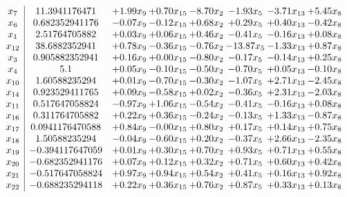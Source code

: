 \documentclass[8pt]{article}
\begin{document}
\[\begin{array}{c| c c@{\hskip 2pt} c@{\hskip 2pt} c@{\hskip 2pt} c@{\hskip 2pt} c@{\hskip 2pt} c@{\hskip 2pt} }
 x_{7}   &  11.3941176471 & +  1.99 x_{9} & +  0.70 x_{15} & -8.70 x_{2} & -1.93 x_{5} & -3.71 x_{13} & +  5.45 x_{8}\\
 x_{6}   &  0.682352941176 & -0.07 x_{9} & -0.12 x_{15} & +  0.68 x_{2} & +  0.29 x_{5} & +  0.40 x_{13} & -0.42 x_{8}\\
 x_{1}   &  2.51764705882 & +  0.03 x_{9} & +  0.06 x_{15} & +  0.46 x_{2} & -0.41 x_{5} & -0.16 x_{13} & +  0.08 x_{8}\\
 x_{12}   &  38.6882352941 & +  0.78 x_{9} & -0.36 x_{15} & -0.76 x_{2} & -13.87 x_{5} & -1.33 x_{13} & +  0.87 x_{8}\\
 x_{3}   &  0.905882352941 & +  0.16 x_{9} & +  0.00 x_{15} & -0.80 x_{2} & -0.17 x_{5} & -0.14 x_{13} & +  0.25 x_{8}\\
 x_{4}   &  5.1 & +  0.05 x_{9} & -0.10 x_{15} & -0.50 x_{2} & -0.70 x_{5} & +  0.05 x_{13} & -0.10 x_{8}\\
 x_{10}   &  1.60588235294 & +  0.01 x_{9} & -0.70 x_{15} & -0.30 x_{2} & -1.07 x_{5} & +  2.71 x_{13} & -2.45 x_{8}\\
 x_{14}   &  0.923529411765 & +  0.09 x_{9} & -0.58 x_{15} & +  0.02 x_{2} & -0.36 x_{5} & +  2.31 x_{13} & -2.03 x_{8}\\
 x_{11}   &  0.517647058824 & -0.97 x_{9} & +  1.06 x_{15} & -0.54 x_{2} & -0.41 x_{5} & -0.16 x_{13} & +  0.08 x_{8}\\
 x_{16}   &  0.311764705882 & +  0.22 x_{9} & +  0.36 x_{15} & -0.24 x_{2} & -0.13 x_{5} & +  1.33 x_{13} & -0.87 x_{8}\\
 x_{17}   &  0.0941176470588 & +  0.84 x_{9} & -0.00 x_{15} & +  0.80 x_{2} & +  0.17 x_{5} & +  0.14 x_{13} & +  0.75 x_{8}\\
 x_{18}   &  1.50588235294 & -0.04 x_{9} & -0.60 x_{15} & +  0.20 x_{2} & -0.37 x_{5} & +  2.66 x_{13} & -2.35 x_{8}\\
 x_{19}   &  -0.394117647059 & +  0.01 x_{9} & +  0.30 x_{15} & +  0.70 x_{2} & +  0.93 x_{5} & +  0.71 x_{13} & +  0.55 x_{8}\\
 x_{20}   &  -0.682352941176 & +  0.07 x_{9} & +  0.12 x_{15} & +  0.32 x_{2} & +  0.71 x_{5} & +  0.60 x_{13} & +  0.42 x_{8}\\
 x_{21}   &  -0.517647058824 & +  0.97 x_{9} & +  0.94 x_{15} & +  0.54 x_{2} & +  0.41 x_{5} & +  0.16 x_{13} & +  0.92 x_{8}\\
 x_{22}   &  -0.688235294118 & +  0.22 x_{9} & +  0.36 x_{15} & +  0.76 x_{2} & +  0.87 x_{5} & +  0.33 x_{13} & +  0.13 x_{8}\\

\end{array}\]
\end{document}
